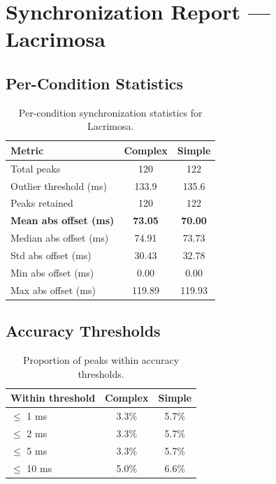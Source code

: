
\section*{Synchronization Report --- Lacrimosa}

\subsection*{Per-Condition Statistics}

\begin{table}[h!]
\centering
\begin{tabular}{|l|c|c|}
\hline
Metric & Complex & Simple \\
\hline
Total peaks & 120 & 122 \\
Outlier threshold (ms) & 133.9 & 135.6 \\
Peaks retained & 120 & 122 \\
\textbf{Mean abs offset (ms)} & \textbf{73.05} & \textbf{70.00} \\
Median abs offset (ms) & 74.91 & 73.73 \\
Std abs offset (ms) & 30.43 & 32.78 \\
Min abs offset (ms) & 0.00 & 0.00 \\
Max abs offset (ms) & 119.89 & 119.93 \\
\hline
\end{tabular}
\caption{Per-condition synchronization statistics for Lacrimosa.}
\label{tab:sync_stats}
\end{table}

\subsection*{Accuracy Thresholds}

\begin{table}[h!]
\centering
\begin{tabular}{|l|c|c|}
\hline
Within threshold & Complex & Simple \\
\hline
$\leq$ 1 ms & 3.3\% & 5.7\% \\
$\leq$ 2 ms & 3.3\% & 5.7\% \\
$\leq$ 5 ms & 3.3\% & 5.7\% \\
$\leq$ 10 ms & 5.0\% & 6.6\% \\
\hline
\end{tabular}
\caption{Proportion of peaks within accuracy thresholds.}
\label{tab:sync_accuracy}
\end{table}

